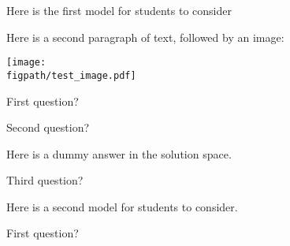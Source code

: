 \begin{activity}
\begin{instructornotes}
\end{instructornotes}


\begin{model}[ABC]

	Here is the first model for students to consider

	Here is a second paragraph of text, followed by an image:

	\centerline{\texttt{[image: \\figpath/test\_image.pdf]}}

\end{model}


\begin{ctqs}

	\question First question?
	
		\begin{solution}[1in]
		\end{solution}
		
	\question Second question?
	
		\begin{solution}[1in]
			Here is a dummy answer in the solution space.
		\end{solution}
		
	\question Third question?
	
		\begin{solution}[1in]
		
			
			
		\end{solution}

\end{ctqs}



\begin{model}[DEF]

	Here is a second model for students to consider.

\end{model}

\begin{ctqs}

	\question First question?
	
		\begin{solution}
		\end{solution}
	

\end{ctqs}
\end{activity}
